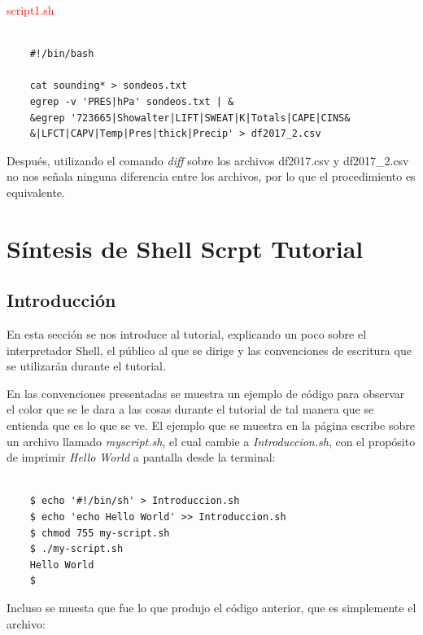 \documentclass{article}
\begin{document}
\newpage

\textcolor{red}{script1.sh}
\begin{framed}
\begin{verbatim}
	
    #!/bin/bash
    
    cat sounding* > sondeos.txt
    egrep -v 'PRES|hPa' sondeos.txt | &
    &egrep '723665|Showalter|LIFT|SWEAT|K|Totals|CAPE|CINS&
    &|LFCT|CAPV|Temp|Pres|thick|Precip' > df2017_2.csv
\end{verbatim}
\end{framed}

Después, utilizando el comando \textit{diff} sobre los archivos df2017.csv y df2017\_2.csv no nos señala ninguna diferencia entre los archivos, por lo que el procedimiento es equivalente.

\newpage

\section{Síntesis de Shell Scrpt Tutorial}

\subsection{Introducción}

En esta sección se nos introduce al tutorial, explicando un poco sobre el interpretador Shell, el público al que se dirige y las convenciones de escritura que se utilizarán durante el tutorial.

En las convenciones presentadas se muestra un ejemplo de código para observar el color que se le dara a las cosas durante el tutorial de tal manera que se entienda que es lo que se ve. El ejemplo que se muestra en la página escribe sobre un archivo llamado \textit{myscript.sh}, el cual cambie a \textit{Introduccion.sh}, con el propósito de imprimir \textit{Hello World} a pantalla desde la terminal:

\begin{framed}
\begin{verbatim}
	
    $ echo '#!/bin/sh' > Introduccion.sh
    $ echo 'echo Hello World' >> Introduccion.sh
    $ chmod 755 my-script.sh
    $ ./my-script.sh
    Hello World
    $
\end{verbatim}
\end{framed}

Incluso se muesta que fue lo que produjo el código anterior, que es simplemente el archivo:~\\
\end{document}
